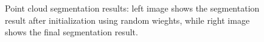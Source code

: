 \documentclass[a4paper]{article}
\begin{document}
	\begin{figure}[thtbp]
	\setlength{\fboxrule}{0.0pt}      
    \caption{Point cloud segmentation results: left image shows the segmentation result after initialization using random wieghts, while right image shows the final segmentation result.}
\end{figure}
\end{document}
